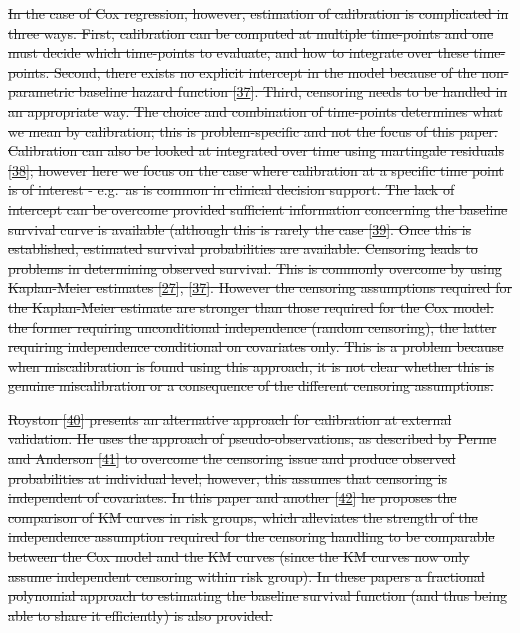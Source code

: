 \documentclass[12pt,PhD,twoside,openright]{muthesis}
\begin{document}
\sout{In the case of Cox regression, however, estimation of calibration is complicated in three ways. First, calibration can be computed at multiple time-points and one must decide which time-points to evaluate, and how to integrate over these time-points. Second, there exists no explicit intercept in the model because of the non-parametric baseline hazard function {[}\protect\hyperlink{ref-royston_external_2013}{37}{]}. Third, censoring needs to be handled in an appropriate way. The choice and combination of time-points determines what we mean by calibration; this is problem-specific and not the focus of this paper. Calibration can also be looked at integrated over time using martingale residuals {[}\protect\hyperlink{ref-crowson_assessing_2016}{38}{]}; however here we focus on the case where calibration at a specific time point is of interest - e.g.~as is common in clinical decision support. The lack of intercept can be overcome provided sufficient information concerning the baseline survival curve is available (although this is rarely the case {[}\protect\hyperlink{ref-houwelingen_validation_2000}{39}{]}. Once this is established, estimated survival probabilities are available. Censoring leads to problems in determining observed survival. This is commonly overcome by using Kaplan-Meier estimates {[}\protect\hyperlink{ref-hippisley-cox_derivation_2007}{27}{]}, {[}\protect\hyperlink{ref-royston_external_2013}{37}{]}. However the censoring assumptions required for the Kaplan-Meier estimate are stronger than those required for the Cox model: the former requiring unconditional independence (random censoring), the latter requiring independence conditional on covariates only. This is a problem because when miscalibration is found using this approach, it is not clear whether this is genuine miscalibration or a consequence of the different censoring assumptions.}

\sout{Royston {[}\protect\hyperlink{ref-royston_tools_2014}{40}{]} presents an alternative approach for calibration at external validation. He uses the approach of pseudo-observations, as described by Perme and Anderson {[}\protect\hyperlink{ref-perme_checking_2008}{41}{]} to overcome the censoring issue and produce observed probabilities at individual level; however, this assumes that censoring is independent of covariates. In this paper and another {[}\protect\hyperlink{ref-royston_tools_2015}{42}{]} he proposes the comparison of KM curves in risk groups, which alleviates the strength of the independence assumption required for the censoring handling to be comparable between the Cox model and the KM curves (since the KM curves now only assume independent censoring within risk group). In these papers a fractional polynomial approach to estimating the baseline survival function (and thus being able to share it efficiently) is also provided.}
\end{document}
